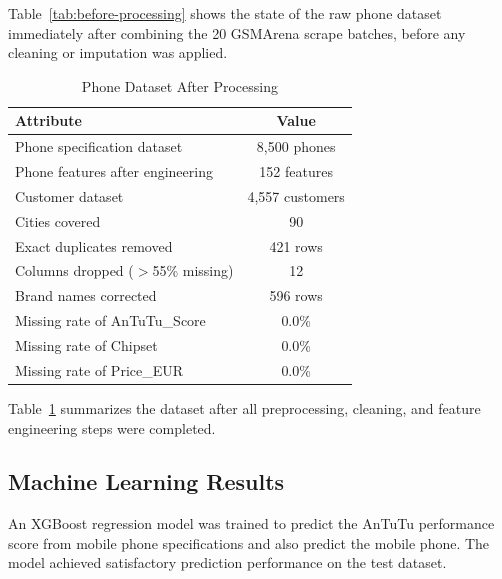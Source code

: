 \documentclass[12pt, a4paper]{report}
\numberwithin{figure}{chapter}
\numberwithin{table}{chapter}
\numberwithin{equation}{chapter}
\begin{document}
Table~\ref{tab:before-processing} shows the state of the raw phone dataset immediately after combining the 20 GSMArena scrape batches, before any cleaning or imputation was applied.

\begin{table}[H]
\centering
\caption{Phone Dataset After Processing}
\label{tab:after-processing}
\begin{tabular}{|l|c|}
\hline
\textbf{Attribute} & \textbf{Value} \\
\hline
Phone specification dataset & 8,500 phones \\
\hline
Phone features after engineering & 152 features \\
\hline
Customer dataset & 4,557 customers \\
\hline
Cities covered & 90 \\
\hline
Exact duplicates removed & 421 rows \\
\hline
Columns dropped ($>$55\% missing) & 12 \\
\hline
Brand names corrected & 596 rows \\
\hline
Missing rate of AnTuTu\_Score & 0.0\% \\
\hline
Missing rate of Chipset & 0.0\% \\
\hline
Missing rate of Price\_EUR & 0.0\% \\
\hline
\end{tabular}
\end{table}
 Table~\ref{tab:after-processing} summarizes the dataset after all preprocessing, cleaning, and feature engineering steps were completed.

\subsection{Machine Learning Results}

An XGBoost regression model was trained to predict the AnTuTu performance score from mobile phone specifications and also predict the mobile phone. The model achieved satisfactory prediction performance on the test dataset.
\end{document}
